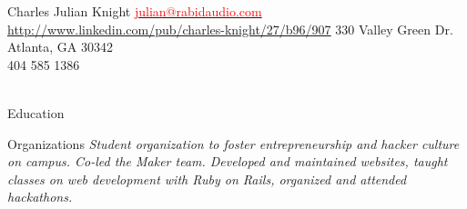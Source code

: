 \documentclass[a4paper,12pt]{article}
\begin{document}
\oddsidemargin=-1cm
\setmainfont

\header
{\LARGE{Charles Julian Knight}}
{{\hspace{.08in}\small \href{mailto:julian@rabidaudio.com}{\textcolor{red}{julian@rabidaudio.com}}}\\
\hspace{0in} \scriptsize \url{http://www.linkedin.com/pub/charles-knight/27/b96/907}}
{330 Valley Green Dr.\\Atlanta, GA 30342\\
{404 585 1386}\\ %
}\\




\begin{resumeblock}{Education}
\largeskip \largeskip
{} %
\largeskip

\end{resumeblock}


\begin{resumeblock}{Organizations}
 \footnotesize{\textit{Student organization to foster entrepreneurship and hacker culture on campus. Co-led the Maker team. Developed and maintained websites, taught classes on web development with Ruby on Rails, organized and attended hackathons. }}

\end{resumeblock}

\end{document}
